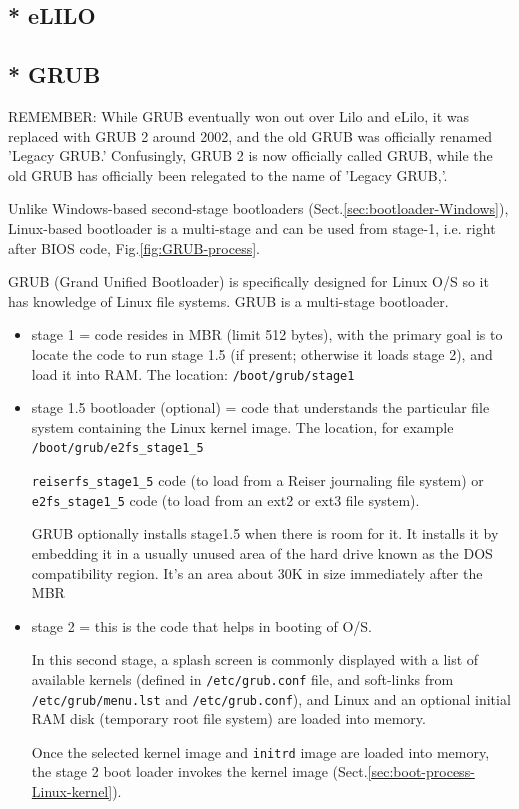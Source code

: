 \subsection{* eLILO}
\label{sec:eLILO}


\subsection{* GRUB}
\label{sec:GRUB}


REMEMBER: While GRUB eventually won out over Lilo and eLilo, it was replaced
with GRUB 2 around 2002, and the old GRUB was officially renamed 'Legacy GRUB.'
Confusingly, GRUB 2 is now officially called GRUB, while the old GRUB has
officially been relegated to the name of 'Legacy GRUB,'.

Unlike Windows-based second-stage bootloaders
(Sect.\ref{sec:bootloader-Windows}), Linux-based bootloader is a multi-stage and
can be used from stage-1, i.e. right after BIOS code,
Fig.\ref{fig:GRUB-process}.


GRUB (Grand Unified Bootloader) is specifically designed for Linux O/S so
it has knowledge of Linux file systems. GRUB is a multi-stage bootloader.

\begin{itemize}
  \item stage 1 = code resides in MBR (limit 512 bytes), with the primary goal
  is to locate the code to run stage 1.5 (if present; otherwise it loads
  stage 2), and load it into RAM. The location: \verb!/boot/grub/stage1!
  
  \item stage 1.5 bootloader (optional) = code that understands the particular
  file system containing the Linux kernel image. The location, for example
  \verb!/boot/grub/e2fs_stage1_5!
  
  \verb!reiserfs_stage1_5! code (to load from a Reiser journaling file system)
  or \verb!e2fs_stage1_5! code (to load from an ext2 or ext3 file system).
  
  GRUB optionally installs stage1.5 when there is room for it. It installs it by
  embedding it in a usually unused area of the hard drive known as the DOS
  compatibility region. It's an area about 30K in size immediately after the
  MBR
  
  \item stage 2 = this is the code that helps in booting of O/S.
  
  In this second stage, a  splash screen is commonly displayed with a list of
  available kernels (defined in \verb!/etc/grub.conf! file, and soft-links from
  \verb!/etc/grub/menu.lst! and \verb!/etc/grub.conf!), and Linux and an
  optional initial RAM disk (temporary root file system) are loaded into memory.
  
  Once the selected kernel image and \verb!initrd! image are loaded into
  memory, the stage 2 boot loader invokes the kernel image
  (Sect.\ref{sec:boot-process-Linux-kernel}).
\end{itemize}

